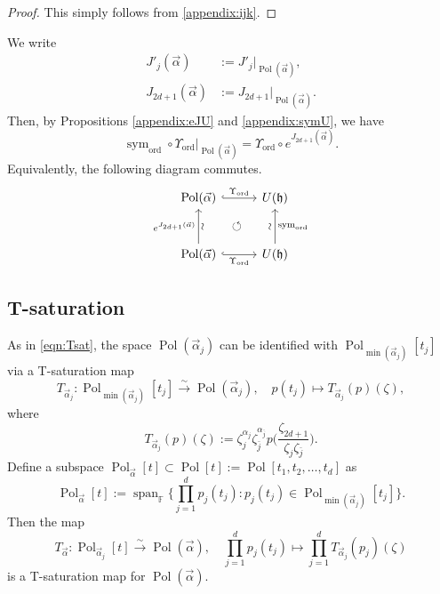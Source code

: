 \documentclass[a4paper,11pt,reqno]{amsart}
\newcommand{\frakh}{\mathfrak{h}}
\newcommand{\0}{{\bf 0}}
\newcommand{\F}{\mathbb{F}}
\newcommand{\1}{{\bf 1}}
\DeclareMathOperator{\Span}{span}
\DeclareMathOperator{\Pol}{Pol}
\newcommand{\ord}{{\mathrm{ord}}}
\newcommand{\valpha}{\vec{\alpha}}
\DeclareMathOperator{\sym}{sym}
\theoremstyle{plain}
\theoremstyle{definition}
\numberwithin{equation}{section}
\theoremstyle{definition}
\begin{document}
\begin{appendices}
\begin{proof}
This simply follows from \eqref{appendix:ijk}.
\end{proof}

We write
\begin{align*}
J'_{j}(\valpha)
&:=J'_{j} \big\vert_{\Pol(\valpha)},\\[3pt]
J_{2d+1}(\valpha)
&:=J_{2d+1} \big\vert_{\Pol(\valpha)}.
\end{align*}
Then, by Propositions \ref{appendix:eJU} and \ref{appendix:symU}, we have 
\begin{equation}\label{eqn:symU1}
\sym_{\ord} \circ \Upsilon_{\ord}\vert_{\Pol(\valpha)} 
= \Upsilon_{\ord} \circ e^{J_{2d+1}(\valpha)}.
\end{equation}
Equivalently, the following diagram commutes.
\begin{equation}\label{appendix:diagram0}
\begin{tikzcd}[row sep=1cm, column sep=1cm]
\Pol(\valpha)
\arrow[r, "\Upsilon_{\ord}", hook]
& 
U(\frakh)
\arrow[dl, pos=0.5, phantom, "\circlearrowleft"]
\\
\Pol(\valpha)
\arrow[u, "e^{J_{2d+1}(\valpha)}","\sim"' sloped]
\arrow[r, "\Upsilon_{\ord}"', hook]
& U(\frakh)
\arrow[u, "\sim" sloped, "\sym_{\ord}"']
\end{tikzcd}
\end{equation}


\subsection{T-saturation}
\label{appendix:T-saturation}

As in \eqref{eqn:Tsat}, the space $\Pol(\valpha_j)$ can be identified with 
$\Pol_{\min(\valpha_j)}[t_j]$ via a T-saturation map
\begin{equation}\label{appendix:Tsat}
T_{\valpha_j}\colon
\Pol_{\min(\valpha_j)}[t_j]\xrightarrow{\sim}\Pol(\valpha_j),\quad 
p(t_j)\mapsto 
T_{\valpha_j}(p)(\zeta),
\end{equation}
where
\begin{equation*}
T_{\valpha_j}(p)(\zeta)
:=
\zeta_j^{\alpha_j}\zeta_{\bar{j}}^{\alpha_{\bar{j}}}p\Big(\frac{\zeta_{2d+1}}{\zeta_j\zeta_{\bar{j}}}\Big).
\end{equation*}
Define a subspace 
$\Pol_{\valpha}[t] \subset \Pol[t]:=\Pol[t_1,t_2,\ldots, t_d]$
 as
\begin{equation*}
\Pol_{\valpha}[t]:=
\Span_\F\big\{\prod_{j=1}^{d} p_j(t_j): p_j(t_j) \in \Pol_{\min(\valpha_j)}[t_j]\big\}.
\end{equation*}
Then the map
\begin{equation}\label{appendix:Tsat2}
T_{\valpha}\colon
\Pol_{\valpha_j}[t]\xrightarrow{\sim}\Pol(\valpha),\quad 
\prod_{j=1}^{d} p_j(t_j)\mapsto
\prod_{j=1}^{d} T_{\valpha_j}(p_j)(\zeta)
\end{equation}
is a T-saturation map for $\Pol(\valpha)$.


\end{appendices}
\end{document}
